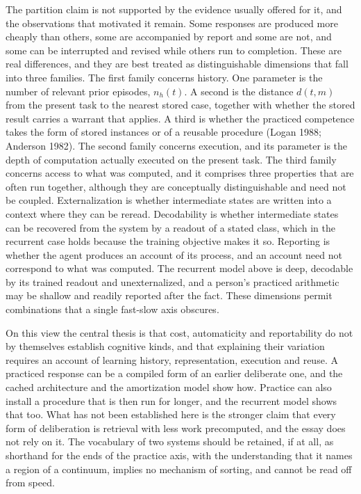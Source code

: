 \documentclass[11pt]{article}
\theoremstyle{definition}
\begin{document}
The partition claim is not supported by the evidence usually offered for it, and the observations that motivated it remain. Some responses are produced more cheaply than others, some are accompanied by report and some are not, and some can be interrupted and revised while others run to completion. These are real differences, and they are best treated as distinguishable dimensions that fall into three families. The first family concerns history. One parameter is the number of relevant prior episodes, $n_h(t)$. A second is the distance $d(t,m)$ from the present task to the nearest stored case, together with whether the stored result carries a warrant that applies. A third is whether the practiced competence takes the form of stored instances or of a reusable procedure (Logan 1988; Anderson 1982). The second family concerns execution, and its parameter is the depth of computation actually executed on the present task. The third family concerns access to what was computed, and it comprises three properties that are often run together, although they are conceptually distinguishable and need not be coupled. Externalization is whether intermediate states are written into a context where they can be reread. Decodability is whether intermediate states can be recovered from the system by a readout of a stated class, which in the recurrent case holds because the training objective makes it so. Reporting is whether the agent produces an account of its process, and an account need not correspond to what was computed. The recurrent model above is deep, decodable by its trained readout and unexternalized, and a person's practiced arithmetic may be shallow and readily reported after the fact. These dimensions permit combinations that a single fast-slow axis obscures.

On this view the central thesis is that cost, automaticity and reportability do not by themselves establish cognitive kinds, and that explaining their variation requires an account of learning history, representation, execution and reuse. A practiced response can be a compiled form of an earlier deliberate one, and the cached architecture and the amortization model show how. Practice can also install a procedure that is then run for longer, and the recurrent model shows that too. What has not been established here is the stronger claim that every form of deliberation is retrieval with less work precomputed, and the essay does not rely on it. The vocabulary of two systems should be retained, if at all, as shorthand for the ends of the practice axis, with the understanding that it names a region of a continuum, implies no mechanism of sorting, and cannot be read off from speed.
\end{document}
